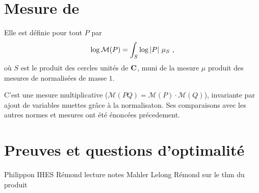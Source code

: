 \documentclass[11pt, twoside, a4paper]{article}
\newcommand*\mahler[1]{\mathcal{M}(#1)}
\begin{document}
\section{Mesure de \texorpdfstring{}{Mahler}}

Elle est définie pour tout $P$ par 
\[
  \log\mahler P 
  = \int_S \log\abs P\, \mu_S \pmm,
\]
où $S$ est le produit des cercles unités de $\mathbf{C}$, muni de la mesure $\mu$
produit des mesures de  normalisées de masse $1$. 

C'est une mesure multiplicative ($\mahler {PQ} = \mahler P \cdot \mahler Q$),
invariante par ajout de variables muettes grâce à la normalisaton. 
Ses comparaisons avec les autres normes et mesures ont été énoncées
précedement.

\section{Preuves et questions d'optimalité}

\begin{thebibliography}{9}
   Philippon IHES
   Rémond lecture notes
   Mahler
   Lelong
   Rémond sur le thm du produit
\end{thebibliography}
\end{document}
